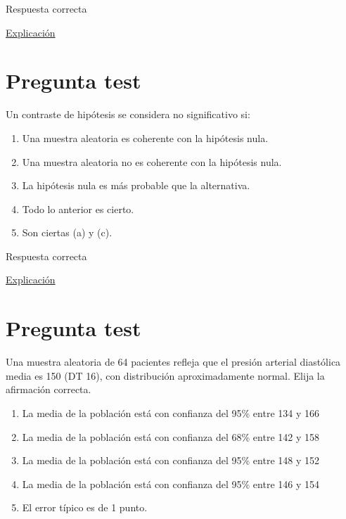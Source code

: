 \documentclass[
]{book}
\providecommand{\tightlist}{%
  \setlength{\itemsep}{0pt}\setlength{\parskip}{0pt}}
\begin{document}
Respuesta correcta

\href{https://homepage.divms.uiowa.edu/~mbognar/}{Explicación}

\hypertarget{pregunta-test-103}{%
\section{Pregunta test}\label{pregunta-test-103}}

Un contraste de hipótesis se considera no significativo si:

\begin{enumerate}
\def\labelenumi{\alph{enumi})}
\tightlist
\item
  Una muestra aleatoria es coherente con la hipótesis nula.
\item
  Una muestra aleatoria no es coherente con la hipótesis nula.
\item
  La hipótesis nula es más probable que la alternativa.
\item
  Todo lo anterior es cierto.
\item
  Son ciertas (a) y (c).
\end{enumerate}

Respuesta correcta

\href{https://1fjmanzano.github.io/bioestadistica/contrastes-de-hipo\%CC\%81tesis.html}{Explicación}

\hypertarget{pregunta-test-104}{%
\section{Pregunta test}\label{pregunta-test-104}}

Una muestra aleatoria de 64 pacientes refleja que el presión arterial diastólica media es 150 (DT 16), con distribución aproximadamente normal. Elija la afirmación correcta.

\begin{enumerate}
\def\labelenumi{\alph{enumi})}
\tightlist
\item
  La media de la población está con confianza del 95\% entre 134 y 166
\item
  La media de la población está con confianza del 68\% entre 142 y 158
\item
  La media de la población está con confianza del 95\% entre 148 y 152
\item
  La media de la población está con confianza del 95\% entre 146 y 154
\item
  El error típico es de 1 punto.
\end{enumerate}
\end{document}
